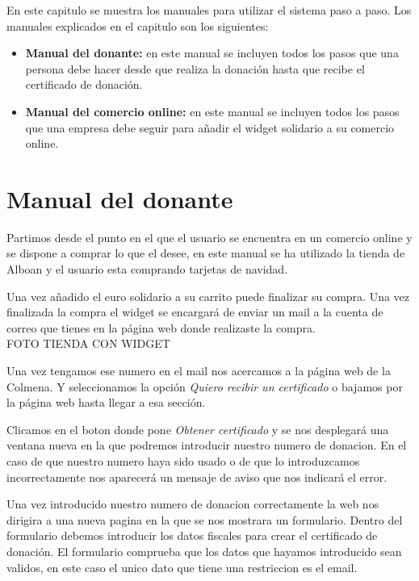 En este capitulo se muestra los manuales para utilizar el sistema paso a paso. Los manuales explicados en el capitulo son los siguientes:

\begin{itemize}
	\item \textbf{Manual del donante:} en este manual se incluyen todos los pasos que una persona debe hacer desde que realiza la donación hasta que recibe el certificado de donación.
	\item \textbf{Manual del comercio online:} en este manual se incluyen todos los pasos que una empresa debe seguir para añadir el widget solidario a su comercio online.
\end{itemize}

\section{Manual del donante}
Partimos desde el punto en el que el usuario se encuentra en un comercio online y se dispone a comprar lo que el desee, en este manual se ha utilizado la tienda de Alboan y el usuario esta comprando tarjetas de navidad. 


Una vez añadido el euro solidario a su carrito puede finalizar su compra. Una vez finalizada la compra el widget se encargará de enviar un mail a la cuenta de correo que tienes en la página web donde realizaste la compra. \\

FOTO TIENDA CON WIDGET

Una vez tengamos ese numero en el mail nos acercamos a la página web de la Colmena. Y seleccionamos la opción \textit{Quiero recibir un certificado} o bajamos por la página web hasta llegar a esa sección.\\


Clicamos en el boton donde pone \textit{Obtener certificado} y se nos desplegará una ventana nueva en la que podremos introducir nuestro numero de donacion. En el caso de que nuestro numero haya sido usado o de que lo introduzcamos incorrectamente nos aparecerá un mensaje de aviso que nos indicará el error. \\


Una vez introducido nuestro numero de donacion correctamente la web nos dirigira a una nueva pagina en la que se nos mostrara un formulario. Dentro del formulario debemos introducir los datos fiscales para crear el certificado de donación. El formulario comprueba que los datos que hayamos introducido sean validos, en este caso el unico dato que tiene una restriccion es el email. \\

